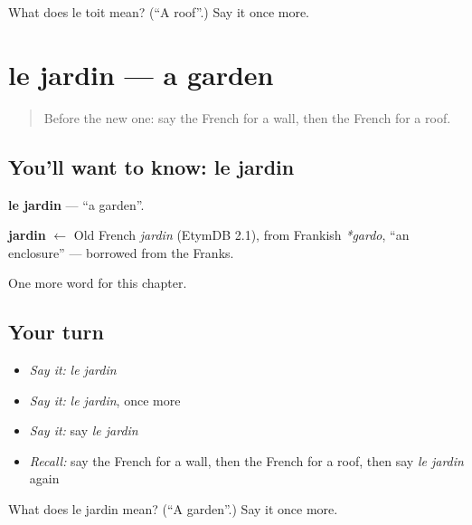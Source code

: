 \begin{tcolorbox}[breakable,colback=teal!4,colframe=teal!35!black,title={Before you move on}]
What does le toit mean? (\textquotedblleft{}A roof\textquotedblright{}.) Say it once more.
\end{tcolorbox}
\section[le jardin]{le jardin — a garden}

\label{lesson:FR-C74-jardin}



\begin{quote}
Before the new one: say the French for a wall, then the French for a roof.
\end{quote}

\subsection*{You'll want to know: le jardin}
\textbf{le jardin} — \textquotedblleft{}a garden\textquotedblright{}.

\begin{cousinweb}
\textbf{jardin} $\leftarrow$ Old French \emph{jardin} (EtymDB 2.1), from Frankish \emph{*gardo}, \textquotedblleft{}an enclosure\textquotedblright{} — borrowed from the Franks.
\end{cousinweb}

\begin{grammarlens}[title={What you've built}]
One more word for this chapter.
\end{grammarlens}

\subsection*{Your turn}
\begin{itemize}
\raggedright
  \item \emph{Say it:} \emph{le jardin}
  \item \emph{Say it:} \emph{le jardin}, once more
  \item \emph{Say it:} say \emph{le jardin}
  \item \emph{Recall:} say the French for a wall, then the French for a roof, then say \emph{le jardin} again
\end{itemize}

\begin{tcolorbox}[breakable,colback=teal!4,colframe=teal!35!black,title={Before you move on}]
What does le jardin mean? (\textquotedblleft{}A garden\textquotedblright{}.) Say it once more.
\end{tcolorbox}
